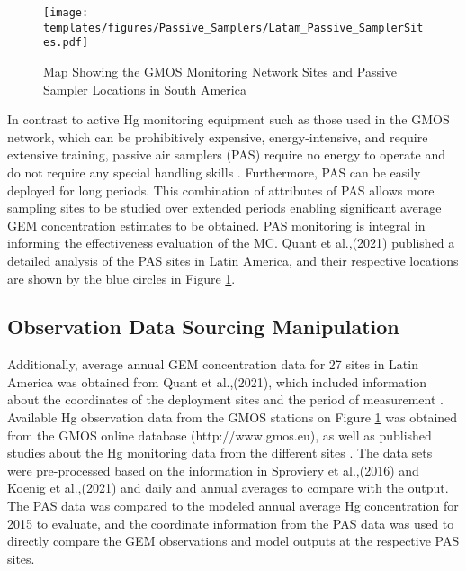 \begin{figure}[H]
 \centering
  \texttt{[image: templates/figures/Passive\_Samplers/Latam\_Passive\_SamplerSites.pdf]}
  \caption{Map Showing the GMOS Monitoring Network Sites and Passive Sampler Locations in South America \cite{quant_measuring_2021,koenig_seasonal_2021}}
  \label{fig:Latam_Passive_SamplerSites}
\end{figure}
\FloatBarrier

\begin{flushleft}
    In contrast to active Hg monitoring equipment such as those used in the GMOS network, which can be prohibitively expensive, energy-intensive, and require extensive training, passive air samplers (PAS) require no energy to operate and do not require any special handling skills \cite{quant_measuring_2021}. Furthermore, PAS can be easily deployed for long periods. This combination of attributes of PAS allows more sampling sites to be studied over extended periods enabling significant average GEM concentration estimates to be obtained. PAS monitoring is integral in informing the effectiveness evaluation of the MC\cite{gustin_measuring_2015,unep_guidance_2021}. Quant et al.,(2021) published a detailed analysis of the PAS sites in Latin America, and their respective locations are shown by the blue circles in Figure \ref{fig:Latam_Passive_SamplerSites}. 
\end{flushleft}

\subsection{Observation Data Sourcing Manipulation}
\begin{flushleft}
  Additionally, average annual GEM concentration data for 27 sites in Latin America was obtained from Quant et al.,(2021), which included information about the coordinates of the deployment sites and the period of measurement \cite{quant_measuring_2021}. Available Hg observation data from the GMOS stations on Figure  \ref{fig:Latam_Passive_SamplerSites} was obtained from the GMOS online database (http://www.gmos.eu), as well as published studies about the Hg monitoring data from the different sites  \cite{koenig_seasonal_2021}. The data sets were pre-processed based on the information in Sproviery et al.,(2016) and Koenig et al.,(2021) and daily and annual averages to compare with the \gc output\cite{koenig_seasonal_2021,sprovieri_atmospheric_2016}. The PAS data was compared to the modeled annual average Hg concentration for 2015 to evaluate, and the coordinate information from the PAS data was used to directly compare the GEM observations and model outputs at the respective PAS sites.
\end{flushleft}





